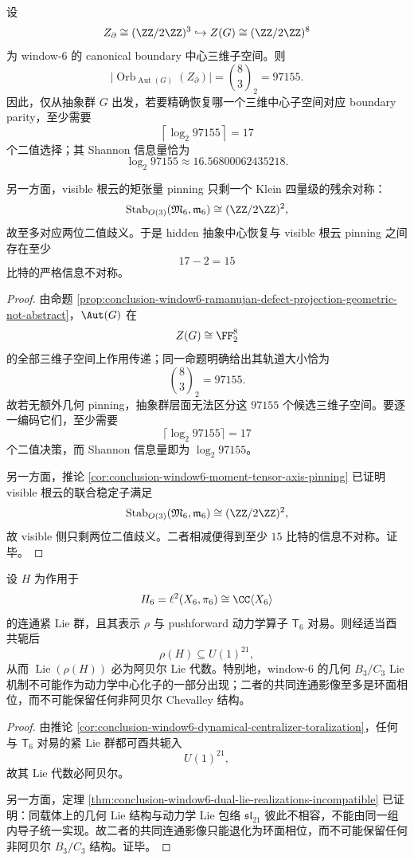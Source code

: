 \begin{theorem}\label{thm:conclusion-window6-boundary-center-seventeen-bit-barrier}
设
\[
Z_\partial\cong (\ZZ/2\ZZ)^3\hookrightarrow Z(G)\cong (\ZZ/2\ZZ)^8
\]
为 window-\(6\) 的 canonical boundary 中心三维子空间。则
\[
\bigl|\operatorname{Orb}_{\operatorname{Aut}(G)}(Z_\partial)\bigr|
=
\binom{8}{3}_2
=
97155.
\]
因此，仅从抽象群 \(G\) 出发，若要精确恢复哪一个三维中心子空间对应 boundary parity，至少需要
\[
\left\lceil \log_2 97155\right\rceil = 17
\]
个二值选择；其 Shannon 信息量恰为
\[
\log_2 97155 \approx 16.56800062435218.
\]

另一方面，visible 根云的矩张量 pinning 只剩一个 Klein 四量级的残余对称：
\[
\operatorname{Stab}_{O(3)}(\mathfrak M_6,\mathfrak m_6)\cong (\ZZ/2\ZZ)^2,
\]
故至多对应两位二值歧义。于是 hidden 抽象中心恢复与 visible 根云 pinning 之间存在至少
\[
17-2=15
\]
比特的严格信息不对称。
\end{theorem}
\begin{proof}
由命题 \ref{prop:conclusion-window6-ramanujan-defect-projection-geometric-not-abstract}，\(\Aut(G)\) 在
\[
Z(G)\cong \FF_2^8
\]
的全部三维子空间上作用传递；同一命题明确给出其轨道大小恰为
\[
\binom{8}{3}_2=97155.
\]
故若无额外几何 pinning，抽象群层面无法区分这 \(97155\) 个候选三维子空间。要逐一编码它们，至少需要
\[
\lceil \log_2 97155\rceil = 17
\]
个二值决策，而 Shannon 信息量即为 \(\log_2 97155\)。

另一方面，推论 \ref{cor:conclusion-window6-moment-tensor-axis-pinning} 已证明 visible 根云的联合稳定子满足
\[
\operatorname{Stab}_{O(3)}(\mathfrak M_6,\mathfrak m_6)\cong (\ZZ/2\ZZ)^2,
\]
故 visible 侧只剩两位二值歧义。二者相减便得到至少 \(15\) 比特的信息不对称。证毕。
\end{proof}

\begin{corollary}\label{cor:conclusion-window6-torus-phase-only-common-shadow}
设 \(H\) 为作用于
\[
H_6=\ell^2(X_6,\pi_6)\cong \CC\langle X_6\rangle
\]
的连通紧 Lie 群，且其表示 \(\rho\) 与 pushforward 动力学算子 \(\mathsf T_6\) 对易。则经适当酉共轭后
\[
\rho(H)\subseteq U(1)^{21},
\]
从而 \(\operatorname{Lie}(\rho(H))\) 必为阿贝尔 Lie 代数。特别地，window-\(6\) 的几何 \(B_3/C_3\) Lie 机制不可能作为动力学中心化子的一部分出现；二者的共同连通影像至多是环面相位，而不可能保留任何非阿贝尔 Chevalley 结构。
\end{corollary}
\begin{proof}
由推论 \ref{cor:conclusion-window6-dynamical-centralizer-toralization}，任何与 \(\mathsf T_6\) 对易的紧 Lie 群都可酉共轭入
\[
U(1)^{21},
\]
故其 Lie 代数必阿贝尔。

另一方面，定理 \ref{thm:conclusion-window6-dual-lie-realizations-incompatible} 已证明：同载体上的几何 Lie 结构与动力学 Lie 包络 \(\mathfrak{sl}_{21}\) 彼此不相容，不能由同一组内导子统一实现。故二者的共同连通影像只能退化为环面相位，而不可能保留任何非阿贝尔 \(B_3/C_3\) 结构。证毕。
\end{proof}

